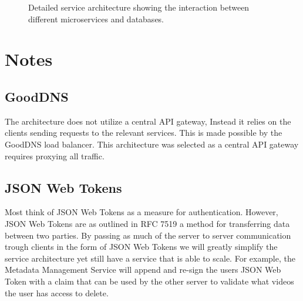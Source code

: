 \documentclass[12pt]{article}
\begin{document}
\begin{figure}[h]
{\begin{tikzpicture}
        \end{tikzpicture}
    }

    \caption{Detailed service architecture showing the interaction between different microservices and databases.}
    \label{fig:AR}
\end{figure}

\clearpage

\section{Notes}

\subsection{GoodDNS}
The architecture does not utilize a central API gateway, Instead it relies on the clients sending requests to the relevant services.
This is made possible by the GoodDNS\cite{heimonenSlenderman00GoodDns2023} load balancer. This architecture was selected as a central
API gateway requires proxying all traffic.

\subsection{JSON Web Tokens}
Most think of JSON Web Tokens as a measure for authentication. However, JSON Web Tokens are as outlined in RFC 7519\cite{jonesJSONWebToken2015} a method
for transferring data between two parties. By passing as much of the server to server communication trough clients in the form of
JSON Web Tokens we will greatly simplify the service architecture yet still have a service that is able to scale.
For example, the Metadata Management Service will append and re-sign the users JSON Web Token with a claim that can be used by the other server to
validate what videos the user has access to delete.


\pagebreak
\printbibliography
\end{document}
